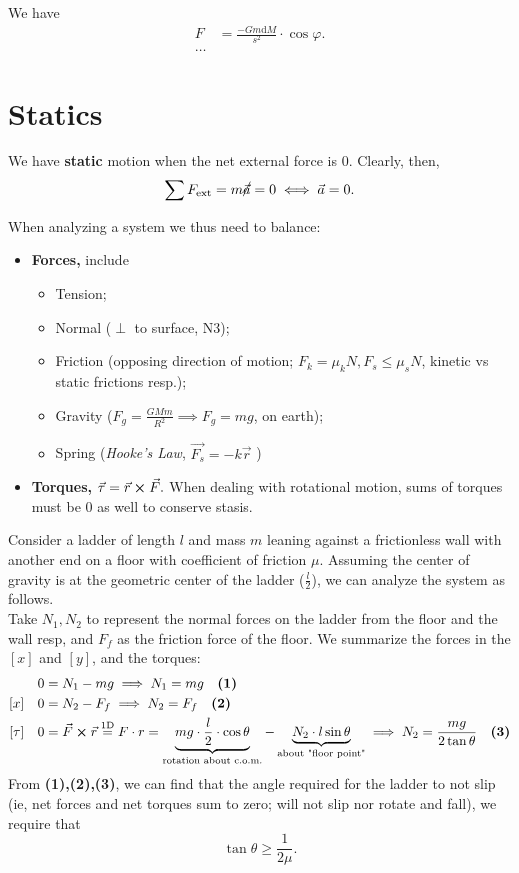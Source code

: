 \documentclass[12pt]{article}
\begin{document}
We have \begin{align*}
  F &= \frac{-G m \text{d}M}{s^2} \cdot \cos \varphi.\\
  \dots
\end{align*}

\section{Statics}
We have \textbf{static} motion when the net external force is $0$. Clearly, then,
\[\sum F_\text{ext} = m \cancel{\vec{a}} = 0 \iff \vec{a} = 0.\]

When analyzing a system we thus need to balance:
\begin{itemize}
  \item \textbf{Forces,} include
  \begin{itemize}
    \item Tension;
    \item Normal ($\perp$ to surface, N3);
    \item Friction (opposing direction of motion; $F_k = \mu_k N, F_s \leq \mu_s N$, kinetic vs static frictions resp.);
    \item Gravity ($F_g = \frac{GM m}{R^2} \implies F_g = mg$, on earth);
    \item Spring (\textit{Hooke's Law}, $\vec{F_s} = -k \vec{r}$ )
  \end{itemize}
  \item \textbf{Torques,} $\vec{\tau} = \vec{r} \cross \vec{F}.$ When dealing with rotational motion, sums of torques must be 0 as well to conserve stasis.
\end{itemize}

\begin{example}
  Consider a ladder of length $l$ and mass $m$ leaning against a frictionless wall with another end on a floor with coefficient of friction $\mu$. Assuming the center of gravity is at the geometric center of the ladder ($\frac{l}{2}$), we can analyze the system as follows.\\
  Take $N_1, N_2$ to represent the normal forces on the ladder from the floor and the wall resp, and $F_f$ as the friction force of the floor. We summarize the forces in the $[x]$ and $[y]$, and the torques:
  \begin{align*}
    [y]&\quad 0 = N_1 - mg \implies N_1 = mg \quad \textbf{(1)}\\
    [x]&\quad 0 = N_2 - F_f \implies N_2 = F_f \quad \textbf{(2)}\\
    [\tau] &\quad 0 = \vec{F} \cross \vec{r} \overset{\text{1D}}{=} F \cdot r = \underbrace{mg \cdot \frac{l}{2} \cdot \cos \theta}_{\text{rotation about c.o.m.}} - \underbrace{N_2 \cdot l \sin \theta}_{\text{about "floor point"}} \implies N_2 = \frac{mg}{2 \tan \theta} \quad \textbf{(3)}
  \end{align*}
  From \textbf{(1),(2),(3)}, we can find that the angle required for the ladder to not slip (ie, net forces and net torques sum to zero; will not slip nor rotate and fall), we require that \[\tan \theta \geq \frac{1}{2\mu}.\]
\end{example}
\end{document}
